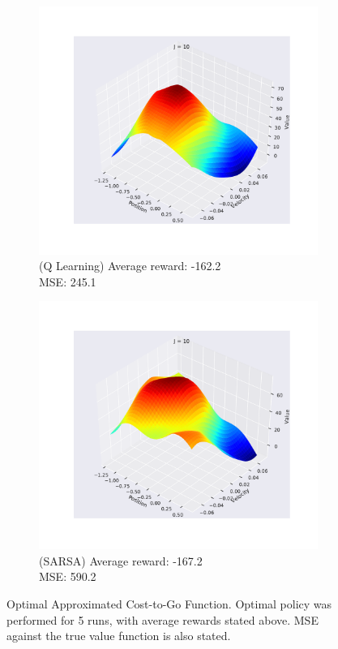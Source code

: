 \documentclass{article}
\begin{document}
\begin{figure}
    \centering
    \begin{subfigure}{.49\linewidth}
        \centering
        \includegraphics[width=\linewidth]{Figures/func_approx_q_learning_value_func_10.pdf}
        \caption{(Q Learning) Average reward: -162.2 \\ MSE: 245.1}
        \label{fig:q_learning}
    \end{subfigure}
    \begin{subfigure}{.49\linewidth}
        \centering
        \includegraphics[width=\linewidth]{Figures/func_approx_sarsa_value_func_10.pdf} 
        \caption{(SARSA) Average reward: -167.2 \\ MSE: 590.2}
        \label{fig:sarsa}
    \end{subfigure}
    \caption{Optimal Approximated Cost-to-Go Function. Optimal policy was performed for 5 runs, with average rewards stated above. MSE against the true value function is also stated.}
    \label{fig:func_approx}
\end{figure}
\end{document}
